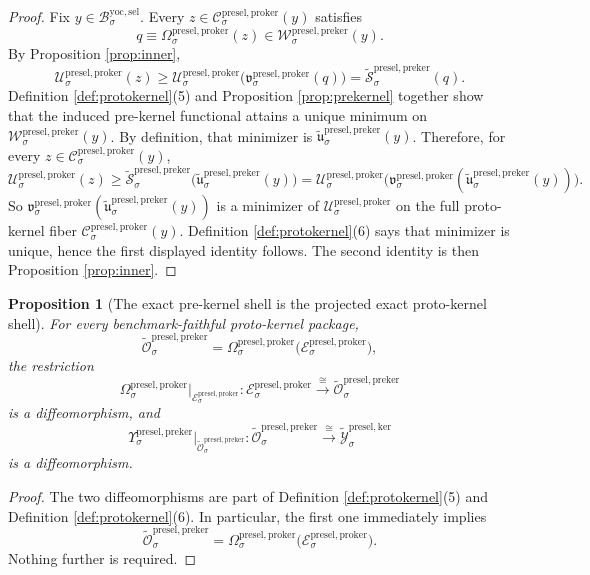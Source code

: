 \documentclass[11pt]{article}
\newcommand{\YoctoSelectorBody}[1]{\mathcal B_{#1}^{\mathrm{yoc,sel}}}
\newcommand{\PreKernelProj}[1]{\Upsilon_{#1}^{\mathrm{presel,preker}}}
\newcommand{\PreKernelFullFiber}[2]{\mathcal W_{#1}^{\mathrm{presel,preker}}(#2)}
\newcommand{\ProtoKernelProj}[1]{\Omega_{#1}^{\mathrm{presel,proker}}}
\newcommand{\ProtoKernelFunctional}[1]{\mathscr U_{#1}^{\mathrm{presel,proker}}}
\newcommand{\ProtoKernelMinLift}[1]{\mathfrak v_{#1}^{\mathrm{presel,proker}}}
\newcommand{\ProtoKernelFullFiber}[2]{\mathcal C_{#1}^{\mathrm{presel,proker}}(#2)}
\newcommand{\ProtoKernelShell}[1]{\mathcal E_{#1}^{\mathrm{presel,proker}}}
\newcommand{\InducedKernelShell}[1]{\widetilde{\mathcal Y}_{#1}^{\mathrm{presel,ker}}}
\newcommand{\InducedPreKernelFunctional}[1]{\widetilde{\mathscr S}_{#1}^{\mathrm{presel,preker}}}
\newcommand{\InducedPreKernelFullMin}[1]{\widetilde{\mathfrak u}_{#1}^{\mathrm{presel,preker}}}
\newcommand{\InducedPreKernelShell}[1]{\widetilde{\mathcal O}_{#1}^{\mathrm{presel,preker}}}
\newtheorem{proposition}{Proposition}
\begin{document}
\begin{proof}
Fix \(y\in\YoctoSelectorBody{\sigma}\). Every \(z\in\ProtoKernelFullFiber{\sigma}{y}\) satisfies
\[
q\equiv\ProtoKernelProj{\sigma}(z)\in\PreKernelFullFiber{\sigma}{y}.
\]
By Proposition \ref{prop:inner},
\[
\ProtoKernelFunctional{\sigma}(z)
\geq
\ProtoKernelFunctional{\sigma}\bigl(\ProtoKernelMinLift{\sigma}(q)\bigr)
=
\InducedPreKernelFunctional{\sigma}(q).
\]
Definition \ref{def:protokernel}(5) and Proposition \ref{prop:prekernel} together show that the induced pre-kernel functional attains a unique minimum on \(\PreKernelFullFiber{\sigma}{y}\). By definition, that minimizer is \(\InducedPreKernelFullMin{\sigma}(y)\). Therefore, for every \(z\in\ProtoKernelFullFiber{\sigma}{y}\),
\[
\ProtoKernelFunctional{\sigma}(z)
\geq
\InducedPreKernelFunctional{\sigma}\bigl(\InducedPreKernelFullMin{\sigma}(y)\bigr)
=
\ProtoKernelFunctional{\sigma}\bigl(\ProtoKernelMinLift{\sigma}(\InducedPreKernelFullMin{\sigma}(y))\bigr).
\]
So \(\ProtoKernelMinLift{\sigma}(\InducedPreKernelFullMin{\sigma}(y))\) is a minimizer of \(\ProtoKernelFunctional{\sigma}\) on the full proto-kernel fiber \(\ProtoKernelFullFiber{\sigma}{y}\). Definition \ref{def:protokernel}(6) says that minimizer is unique, hence the first displayed identity follows. The second identity is then Proposition \ref{prop:inner}.
\end{proof}

\begin{proposition}[The exact pre-kernel shell is the projected exact proto-kernel shell]
\label{prop:shell}
For every benchmark-faithful proto-kernel package,
\[
\InducedPreKernelShell{\sigma}
=
\ProtoKernelProj{\sigma}\bigl(\ProtoKernelShell{\sigma}\bigr),
\]
the restriction
\[
\ProtoKernelProj{\sigma}\big|_{\ProtoKernelShell{\sigma}}
:
\ProtoKernelShell{\sigma}\xrightarrow{\cong}\InducedPreKernelShell{\sigma}
\]
is a diffeomorphism, and
\[
\PreKernelProj{\sigma}\big|_{\InducedPreKernelShell{\sigma}}
:
\InducedPreKernelShell{\sigma}\xrightarrow{\cong}\InducedKernelShell{\sigma}
\]
is a diffeomorphism.
\end{proposition}

\begin{proof}
The two diffeomorphisms are part of Definition \ref{def:protokernel}(5) and Definition \ref{def:protokernel}(6). In particular, the first one immediately implies
\[
\InducedPreKernelShell{\sigma}
=
\ProtoKernelProj{\sigma}\bigl(\ProtoKernelShell{\sigma}\bigr).
\]
Nothing further is required.
\end{proof}
\end{document}
